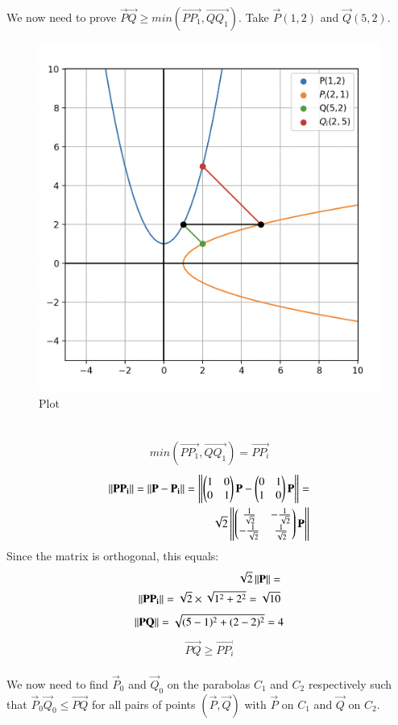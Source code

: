 \documentclass[12pt]{article}
\begin{document}
We now need to prove $\vec{P}\vec{Q} \geq min(\vec{PP_1}, \vec{QQ_1}).$ Take $\vec{P}(1,2)$ and $\vec{Q}(5,2)$.
\begin{figure}[H]
    \centering
    \includegraphics[width=0.5\columnwidth]{Figs/10753.png}
    \caption{Plot}
    \label{fig:placeholder}
\end{figure}\\
\begin{align} min(\vec{PP_1}, \vec{QQ_1}) = \vec{PP_i}\end{align}
\begin{align}
\left\lVert\mathbf{PP_i}\right\rVert = \left\lVert\mathbf{P} - \mathbf{P_i} \right\rVert= \left\lVert\begin{pmatrix}1&0\\0&1\end{pmatrix}\mathbf{P} - \begin{pmatrix}0&1\\1&0\end{pmatrix}\mathbf{P}\right\rVert =\\
\sqrt{2}\left\lVert\begin{pmatrix}\frac{1}{\sqrt{2}} &-\frac{1}{\sqrt{2}} \\ -\frac{1}{\sqrt{2}} & \frac{1}{\sqrt{2}}\end{pmatrix}\mathbf{P}\right\rVert
\end{align}
Since the matrix is orthogonal, this equals:
\begin{align}
\sqrt{2}\left\lVert\mathbf{P}\right\rVert =\\
 \left\lVert\mathbf{PP_i}\right\rVert = \sqrt{2}\times \sqrt{1^2 + 2^2} = \sqrt{10}
\end{align}
\begin{align}
    \left\lVert\mathbf{PQ}\right\rVert = \sqrt{(5-1)^2 + (2-2)^2} = 4
\end{align}
\begin{align}\vec{PQ} \geq \vec{PP_i}\end{align}\\
We now need to find $\vec{P}_0$ and $\vec{Q}_0$ on the parabolas $C_1$ and $C_2$ respectively such that $\vec{P}_0\vec{Q}_0 \leq \vec{PQ}$ for all pairs of points $(\vec{P}, \vec{Q})$
with $\vec{P}$ on $C_1$ and $\vec{Q}$ on $C_2$. \vspace{1cm}\\
\end{document}
